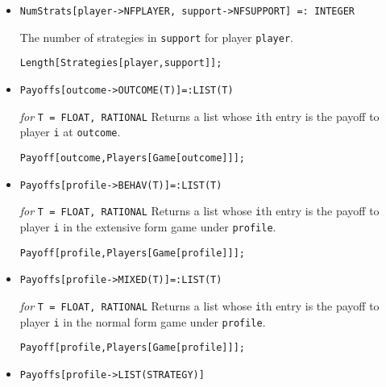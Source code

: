 \begin{itemize}
\item{}
\protect \large \begin{verbatim}
NumStrats[player->NFPLAYER, support->NFSUPPORT] =: INTEGER
\end{verbatim}\normalsize

\bd 
The number of strategies in \verb+support+ for player \verb+player+.
\begin{verbatim}
Length[Strategies[player,support]]; 
\end{verbatim} 
\ed

\item{}
\protect \large \begin{verbatim}
Payoffs[outcome->OUTCOME(T)]=:LIST(T)
\end{verbatim}\normalsize

{\it for} {\tt T = FLOAT, RATIONAL}
\bd 
Returns a list whose \verb+i+th entry is the payoff to player \verb+i+
at \verb+outcome+.
\begin{verbatim}
Payoff[outcome,Players[Game[outcome]]];
\end{verbatim} 
\ed

\item{}
\protect \large \begin{verbatim}
Payoffs[profile->BEHAV(T)]=:LIST(T)
\end{verbatim}\normalsize

{\it for} {\tt T = FLOAT, RATIONAL}
\bd 
Returns a list whose \verb+i+th entry is the payoff to player \verb+i+
in the extensive form game under \verb+profile+.
\begin{verbatim}
Payoff[profile,Players[Game[profile]]];
\end{verbatim} 
\ed

\item{}
\protect \large \begin{verbatim}
Payoffs[profile->MIXED(T)]=:LIST(T)
\end{verbatim}\normalsize

{\it for} {\tt T = FLOAT, RATIONAL}
\bd 
Returns a list whose \verb+i+th entry is the payoff to player \verb+i+
in the normal form game under \verb+profile+.
\begin{verbatim}
Payoff[profile,Players[Game[profile]]];
\end{verbatim} 
\ed

\item{}
\protect \large \begin{verbatim}
Payoffs[profile->LIST(STRATEGY)]
\end{verbatim}\normalsize


\end{itemize}
